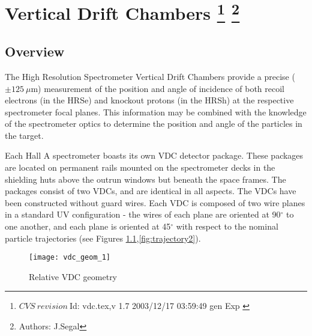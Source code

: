 \chapter[Vertical Drift Chambers]{Vertical Drift Chambers
\footnote{
  $CVS~revision~ $Id: vdc.tex,v 1.7 2003/12/17 03:59:49 gen Exp $ $
}
\footnote{Authors: J.Segal }
}




\section{Overview}

The High Resolution Spectrometer Vertical Drift Chambers provide a
precise ($\pm 125~\mu$m) measurement of the position and angle of
incidence of both recoil electrons (in the HRSe) and knockout protons
(in the HRSh) at the respective spectrometer focal planes.  This
information may be combined with the knowledge of the spectrometer
optics to determine the position and angle of the particles in the
target.

Each Hall A spectrometer boasts its own VDC detector package.  These
packages are located on permanent rails mounted on the spectrometer
decks in the shielding huts above the outrun windows but beneath the
space frames.  The packages consist of two VDCs, and are identical
in all aspects.  The VDCs have been constructed without guard wires.
Each VDC is composed of two wire planes in a standard UV
configuration - the wires of each plane are oriented at 90$^\circ$
to one another, and each plane is oriented at 45$^\circ$ with respect
to the nominal particle trajectories (see Figures
\ref{fig:trajectory1},\ref{fig:trajectory2}).

\begin{figure}
\begin{center}
\texttt{[image: vdc\_geom\_1]}
\caption[Detectors: VDC Geometry]{Relative VDC geometry}
\label{fig:trajectory1}
\end{center}
\end{figure}

